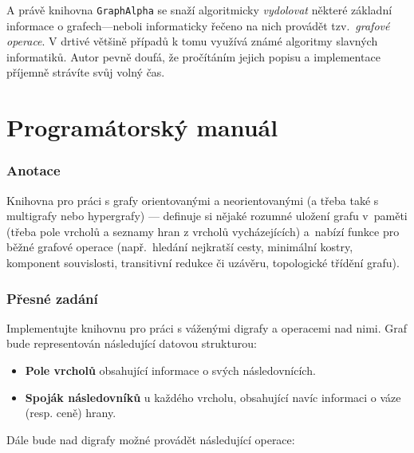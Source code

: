 \documentclass[11pt,a4paper]{article}
\begin{document}
A právě knihovna {\tt GraphAlpha} se snaží algoritmicky {\sl vydolovat\/}
  některé základní informace o grafech---neboli informaticky řečeno na nich
  provádět tzv.~{\sl grafové operace\/}.
V drtivé většině případů k tomu využívá známé algoritmy slavných informatiků.
Autor pevně doufá, že pročítáním jejich popisu a implementace příjemně strávíte 
  svůj volný čas.

\pagebreak

\part{Programátorský manuál}
\section{Anotace}
Knihovna pro práci s grafy orientovanými a neorientovanými (a třeba také s
multigrafy nebo hypergrafy) --- definuje si nějaké rozumné uložení grafu
v~paměti (třeba pole vrcholů a seznamy hran z vrcholů vycházejících) a~nabízí
funkce pro běžné grafové operace (např.\ hledání nejkratší cesty, minimální
kostry, komponent souvislosti, transitivní redukce či uzávěru, topologické
třídění grafu). 

\section{Přesné zadání}
Implementujte knihovnu pro práci s váženými digrafy a operacemi nad nimi.
Graf bude representován následující datovou strukturou:

\renewcommand{\labelitemi}{$\spadesuit$}

\begin{itemize}
\item \textbf{Pole vrcholů} obsahující informace o svých následovnících.
\item \textbf{Spoják následovníků} u každého vrcholu, obsahující navíc
informaci o váze (resp. ceně) hrany.
\end{itemize}

Dále bude nad digrafy možné provádět následující operace:

\renewcommand{\labelitemi}{$\clubsuit$}
\end{document}
